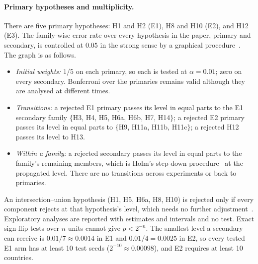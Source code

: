 \documentclass[10pt]{article}
\theoremstyle{remark}
\begin{document}
\paragraph{Primary hypotheses and multiplicity.} There are five primary hypotheses: H1 and H2 (E1), H8 and H10 (E2), and H12 (E3). The family-wise error rate over every hypothesis in the paper, primary and secondary, is controlled at $0.05$ in the strong sense by a graphical procedure~\cite{bretz2009}. The graph is as follows.
\begin{itemize}
\setlength\itemsep{1pt}
\item \emph{Initial weights:} $1/5$ on each primary, so each is tested at $\alpha=0.01$; zero on every secondary. Bonferroni over the primaries remains valid although they are analysed at different times.
\item \emph{Transitions:} a rejected E1 primary passes its level in equal parts to the E1 secondary family $\{$H3, H4, H5, H6a, H6b, H7, H14$\}$; a rejected E2 primary passes its level in equal parts to $\{$H9, H11a, H11b, H11c$\}$; a rejected H12 passes its level to H13.
\item \emph{Within a family:} a rejected secondary passes its level in equal parts to the family's remaining members, which is Holm's step-down procedure~\cite{holm1979} at the propagated level. There are no transitions across experiments or back to primaries.
\end{itemize}
An intersection--union hypothesis (H1, H5, H6a, H8, H10) is rejected only if every component rejects at that hypothesis's level, which needs no further adjustment~\cite{bergerhsu1996}. Exploratory analyses are reported with estimates and intervals and no test. Exact sign-flip tests over $n$ units cannot give $p<2^{-n}$. The smallest level a secondary can receive is $0.01/7\approx0.0014$ in E1 and $0.01/4=0.0025$ in E2, so every tested E1 arm has at least 10 test seeds ($2^{-10}\approx0.00098$), and E2 requires at least 10 countries.
\end{document}
